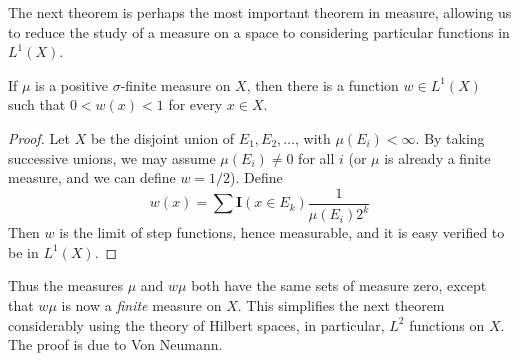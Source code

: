 The next theorem is perhaps the most important theorem in measure, allowing us to reduce the study of a measure on a space to considering particular functions in $L^1(X)$.

\begin{lemma}
    If $\mu$ is a positive $\sigma$-finite measure on $X$, then there is a function $w \in L^1(X)$ such that $0 < w(x) < 1$ for every $x \in X$.
\end{lemma}
\begin{proof}
    Let $X$ be the disjoint union of $E_1, E_2, \dots$, with $\mu(E_i) < \infty$. By taking successive unions, we may assume $\mu(E_i) \neq 0$ for all $i$ (or $\mu$ is already a finite measure, and we can define $w = 1/2$). Define
    \[ w(x) = \sum \mathbf{I}(x \in E_k) \frac{1}{\mu(E_i) 2^k} \]
    Then $w$ is the limit of step functions, hence measurable, and it is easy verified to be in $L^1(X)$.
\end{proof}

Thus the measures $\mu$ and $w\mu$ both have the same sets of measure zero, except that $w\mu$ is now a {\it finite} measure on $X$. This simplifies the next theorem considerably using the theory of Hilbert spaces, in particular, $L^2$ functions on $X$. The proof is due to Von Neumann.

